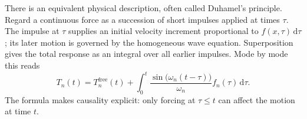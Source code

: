 There is an equivalent physical description, often called Duhamel's principle. Regard a continuous force as a succession of short impulses applied at times $\tau$. The impulse at $\tau$ supplies an initial velocity increment proportional to $f(x,\tau)\,\mathrm d\tau$; its later motion is governed by the homogeneous wave equation. Superposition gives the total response as an integral over all earlier impulses. Mode by mode this reads
\begin{equation}
T_n(t)=T_n^{\mathrm{free}}(t)
+\int_0^t\frac{\sin\bigl(\omega_n(t-\tau)\bigr)}{\omega_n}
f_n(\tau)\,\mathrm d\tau.
\end{equation}
The formula makes causality explicit: only forcing at $\tau\leq t$ can affect the motion at time $t$.